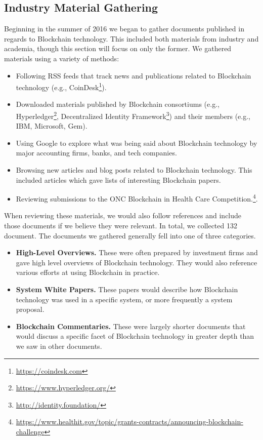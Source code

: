 \subsection{Industry Material Gathering}
Beginning in the summer of 2016 we began to gather documents published in regards to Blockchain technology.
This included both materials from industry and academia, though this section will focus on only the former.
We gathered materials using a variety of methods:

\begin{itemize}
	\item Following RSS feeds that track news and publications related to Blockchain technology (e.g., CoinDesk\footnote{\url{https://coindesk.com}}).
	\item Downloaded materials published by Blockchain consortiums (e.g., Hyperledger\footnote{\url{https://www.hyperledger.org/}}, Decentralized Identity Framework\footnote{\url{http://identity.foundation/}}) and their members (e.g., IBM, Microsoft, Gem).
	\item Using Google to explore what was being said about Blockchain technology by major accounting firms, banks, and tech companies.
	\item Browsing new articles and blog posts related to Blockchain technology. This included articles which gave lists of interesting Blockchain papers.
	\item Reviewing submissions to the ONC Blockchain in Health Care Competition.\footnote{\url{https://www.healthit.gov/topic/grants-contracts/announcing-blockchain-challenge}}.
\end{itemize}

When reviewing these materials, we would also follow references and include those documents if we believe they were relevant.
In total, we collected 132 document.
The documents we gathered generally fell into one of three categories.

\begin{itemize}
	\item \textbf{High-Level Overviews.} These were often prepared by investment firms and gave high level overviews of Blockchain technology. They would also reference various efforts at using Blockchain in practice.
	\item \textbf{System White Papers.} These papers would describe how Blockchain technology was used in a specific system, or more frequently a system proposal.
	\item \textbf{Blockchain Commentaries.} These were largely shorter documents that would discuss a specific facet of Blockchain technology in greater depth than we saw in other documents.
\end{itemize}

